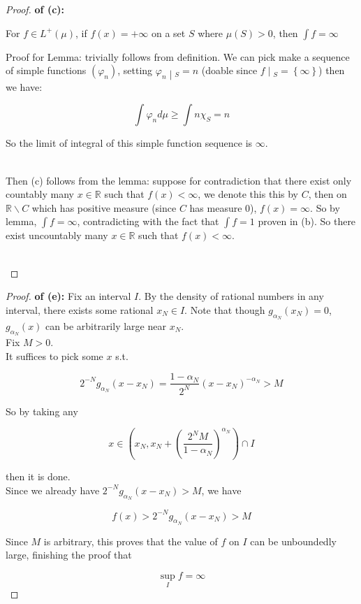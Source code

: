 \begin{proof}

\textbf{of (c):}

\begin{lemma}

For \(f \in L^{+}(\mu)\), if \(f(x) = + \infty\) on a set \(S\) where \(\mu(S) > 0\), then \(\int f = \infty\)

\end{lemma}

Proof for Lemma: trivially follows from definition. We can pick make a sequence of simple functions \((\varphi_{n})\), setting \(\left. \varphi_{n} \middle| {}_{S} = n \right.\) (doable since \(\left. f \middle| {}_{S} = \left\{ \infty \right\} \right.\)) then we have:

\[\int\varphi_{n} d\mu \geq \int n\chi_{S} = n\]

So the limit of integral of this simple function sequence is \(\infty\).\\
\strut \\
Then (c) follows from the lemma: suppose for contradiction that there exist only countably many \(x \in \mathbb{R}\) such that \(f(x) < \infty\), we denote this this by \(C\), then on \(\mathbb{R}\backslash C\) which has positive measure (since \(C\) has measure 0), \(f(x) = \infty\). So by lemma, \(\int f = \infty\), contradicting with the fact that \(\int f = 1\) proven in (b). So there exist uncountably many \(x \in \mathbb{R}\) such that \(f(x) < \infty\).\\
\strut \\

\end{proof}

\begin{proof}

\textbf{of (e):} Fix an interval \(I\). By the density of rational numbers in any interval, there exists some rational \(x_{N} \in I\). Note that though \(g_{\alpha_{N}}(x_{N}) = 0\), \(g_{\alpha_{N}}(x)\) can be arbitrarily large near \(x_{N}\).\\
Fix \(M > 0\).\\
It suffices to pick some \(x\) s.t.

\[2^{- N}g_{\alpha_{N}}(x - x_{N}) = \frac{1 - \alpha_{N}}{2^{N}}(x - x_{N})^{- \alpha_{N}} > M\]

So by taking any

\[x \in (x_{N},x_{N} + (\frac{2^{N}M}{1 - \alpha_{N}})^{\alpha_{N}}) \cap I\]

then it is done.\\
Since we already have \(2^{- N}g_{\alpha_{N}}(x - x_{N}) > M\), we have

\[f(x) > 2^{- N}g_{\alpha_{N}}(x - x_{N}) > M\]

Since \(M\) is arbitrary, this proves that the value of \(f\) on \(I\) can be unboundedly large, finishing the proof that

\[\sup\limits_{I}f = \infty\]

\end{proof}

